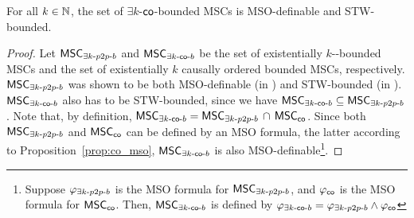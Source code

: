 \documentclass{article}
\begin{document}
\begin{proposition}
For all $k \in \N$, the set of $\exists k$-$\cosymb$-bounded MSCs is MSO-definable and STW-bounded.
\end{proposition}
\begin{proof}
Let $\Ekpp$ and $\Ekco$ be the set of existentially $k$-\pp-bounded MSCs and the set of existentially $k$ causally ordered bounded MSCs, respectively. $\Ekpp$ was shown to be both MSO-definable (in \cite{DBLP:journals/iandc/LohreyM04}) and STW-bounded (in \cite[Proposition 5.4, page 163]{DBLP:journals/corr/abs-1904-06942}). $\Ekco$ also has to be STW-bounded, since we have $\Ekco \subseteq \Ekpp$. Note that, by definition, $\Ekco = \Ekpp\, \cap\, \coMSCs$. Since both $\Ekpp$ and $\coMSCs$ can be defined by an MSO formula, the latter according to Proposition~\ref{prop:co_mso}, $\Ekco$ is also MSO-definable\footnote{Suppose $\varphi_{\exists k\text{-}\pp\text{-}b}$ is the MSO formula for $\Ekpp$, and $\coformula$ is the MSO formula for $\coMSCs$. Then, $\Ekco$ is defined by $\varphi_{\exists k\text{-}\cosymb\text{-}b} = \varphi_{\exists k\text{-}\pp\text{-}b} \wedge \coformula$}.
\end{proof}

\printbibliography
\end{document}

